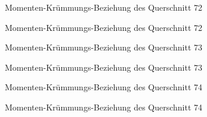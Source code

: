 \documentclass[
  11pt,
  letterpaper,
]{scrreprt}
\begin{document}
\begin{figure}[H]


\caption{\label{fig-qs_72}Momenten-Krümmungs-Beziehung des Querschnitt
72}

\end{figure}%

\begin{figure}[H]


\caption{\label{fig-m_chi_72}Momenten-Krümmungs-Beziehung des
Querschnitt 72}

\end{figure}%

\begin{figure}[H]


\caption{\label{fig-qs_73}Momenten-Krümmungs-Beziehung des Querschnitt
73}

\end{figure}%

\begin{figure}[H]


\caption{\label{fig-m_chi_73}Momenten-Krümmungs-Beziehung des
Querschnitt 73}

\end{figure}%

\begin{figure}[H]


\caption{\label{fig-qs_74}Momenten-Krümmungs-Beziehung des Querschnitt
74}

\end{figure}%

\begin{figure}[H]


\caption{\label{fig-m_chi_74}Momenten-Krümmungs-Beziehung des
Querschnitt 74}

\end{figure}%
\end{document}
